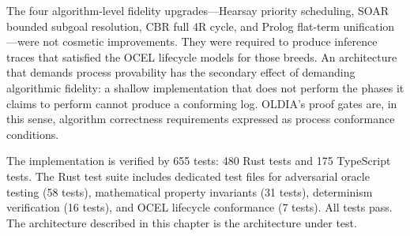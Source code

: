 The four algorithm-level fidelity upgrades---Hearsay priority scheduling, SOAR bounded subgoal resolution, CBR full 4R cycle, and Prolog flat-term unification---were not cosmetic improvements. They were required to produce inference traces that satisfied the OCEL lifecycle models for those breeds. An architecture that demands process provability has the secondary effect of demanding algorithmic fidelity: a shallow implementation that does not perform the phases it claims to perform cannot produce a conforming log. OLDIA's proof gates are, in this sense, algorithm correctness requirements expressed as process conformance conditions.

The implementation is verified by 655 tests: 480 Rust tests and 175 TypeScript tests. The Rust test suite includes dedicated test files for adversarial oracle testing (58 tests), mathematical property invariants (31 tests), determinism verification (16 tests), and OCEL lifecycle conformance (7 tests). All tests pass. The architecture described in this chapter is the architecture under test.
